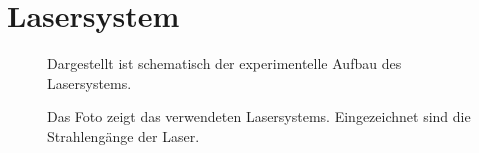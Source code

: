 \section{Lasersystem}\label{sec:lasersystem}
\begin{figure}[h]
 	\centering
	\caption[Experimenteller Aufbau des Lasersystems, schematisch]{Dargestellt ist
	schematisch der experimentelle Aufbau des
	Lasersystems.}\label{fig:experimenteller_aufbau_lasersystem}
\end{figure}
\begin{figure}[h]
 	\centering
	\caption[Experimenteller Aufbau des Lasersystems -
	Foto]{Das Foto zeigt das verwendeten Lasersystems. Eingezeichnet sind die
	Strahlengänge der Laser.}\label{fig:experimenteller_aufbau_lasersystem_foto}
\end{figure}
